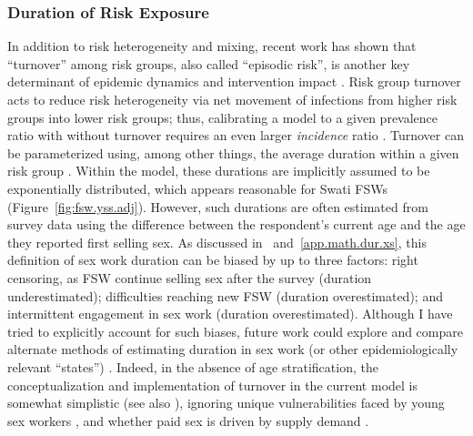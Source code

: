 \subsubsection{Duration of Risk Exposure}\label{model.disc.par.dur}
In addition to risk heterogeneity and mixing, recent work has shown that
``turnover'' among risk groups, also called ``episodic risk'', is another key determinant of
epidemic dynamics and intervention impact \cite{Henry2015,Knight2020}.
Risk group turnover acts to reduce risk heterogeneity via
net movement of infections from higher risk groups into lower risk groups;
thus, calibrating a model to a given prevalence ratio with \vs without turnover
requires an even larger \emph{incidence} ratio \cite{Knight2020}.
Turnover can be parameterized using, among other things,
the average duration within a given risk group \cite{Knight2020}.
Within the model, these durations are implicitly assumed to be exponentially distributed,
which appears reasonable for Swati FSWs \cite{Baral2014,EswKP2014} (Figure~\ref{fig:fsw.yss.adj}).
However, such durations are often estimated from survey data using the difference between
the respondent's current age and the age they reported first selling sex.
As discussed in ~and~\ref{app.math.dur.xs},
this definition of sex work duration can be biased by up to three factors:
right censoring, as FSW continue selling sex after the survey (duration underestimated);
difficulties reaching new FSW \cite{Cheuk2020} (duration overestimated);
and intermittent engagement in sex work (duration overestimated).
Although I have tried to explicitly account for such biases,
future work could explore and compare alternate methods of estimating
duration in sex work (or other epidemiologically relevant ``states'') \cite{Fazito2012}.
Indeed, in the absence of age stratification,
the conceptualization and implementation of turnover in the current model is somewhat simplistic
(see also ), ignoring
unique vulnerabilities faced by young sex workers \cite{Cheuk2020}, and
whether paid sex is driven by supply \vs demand \cite{Garnett1993,Steen2019}.
